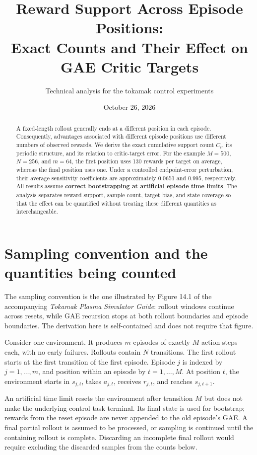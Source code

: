 \documentclass[11pt,a4paper]{article}
\title{Reward Support Across Episode Positions:\\Exact Counts and Their Effect on GAE Critic Targets}
\author{Technical analysis for the tokamak control experiments}
\date{October 26, 2026}
\numberwithin{equation}{section}
\begin{document}
\maketitle
\begin{abstract}
A fixed-length rollout generally ends at a different position in each episode.
Consequently, advantages associated with different episode positions use different
numbers of observed rewards. We derive the exact cumulative support count $C_t$,
its periodic structure, and its relation to critic-target error. For the example
$M=500$, $N=256$, and $m=64$, the first position uses 130 rewards per target on
average, whereas the final position uses one. Under a controlled endpoint-error
perturbation, their average sensitivity coefficients are approximately 0.0651 and
0.995, respectively. All results assume \textbf{correct bootstrapping at artificial
episode time limits}. The analysis separates reward support, sample count, target
bias, and state coverage so that the effect can be quantified without treating
these different quantities as interchangeable.
\end{abstract}

\section{Sampling convention and the quantities being counted}
The sampling convention is the one illustrated by Figure 14.1 of the accompanying
\emph{Tokamak Plasma Simulator Guide}: rollout windows continue across resets,
while GAE recursion stops at both rollout boundaries and episode boundaries.
The derivation here is self-contained and does not require that figure.

Consider one environment. It produces $m$ episodes of exactly $M$ action steps
each, with no early failures. Rollouts contain $N$ transitions. The first rollout
starts at the first transition of the first episode. Episode $j$ is indexed by
$j=1,\ldots,m$, and position within an episode by $t=1,\ldots,M$.
At position $t$, the environment starts in $s_{j,t}$, takes $a_{j,t}$, receives
$r_{j,t}$, and reaches $s_{j,t+1}$.

An artificial time limit resets the environment after transition $M$ but does
not make the underlying control task terminal. Its final state is used for
bootstrap; rewards from the reset episode are never appended to the old episode's
GAE. A final partial rollout is assumed to be processed, or sampling is continued
until the containing rollout is complete. Discarding an incomplete final rollout
would require excluding the discarded samples from the counts below.
\end{document}
